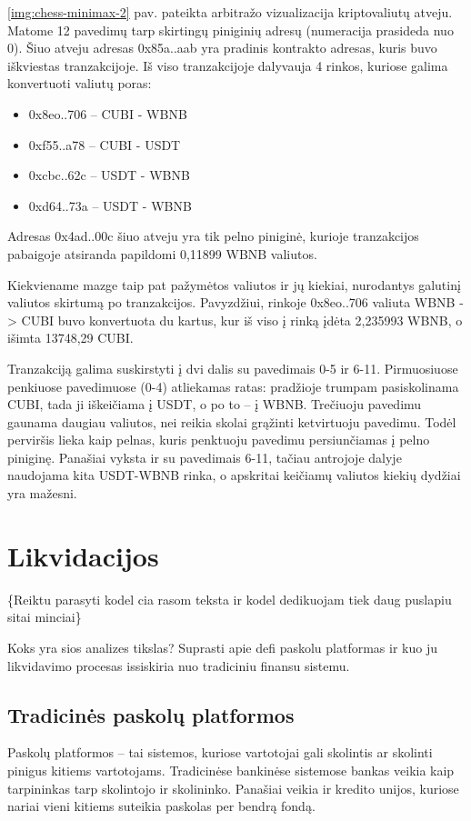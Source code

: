 \documentclass[]{VUMIFTemplateClass}
\begin{document}
\ref{img:chess-minimax-2} pav. pateikta arbitražo vizualizacija kriptovaliutų atveju. Matome 12 pavedimų tarp skirtingų piniginių adresų (numeracija prasideda nuo 0). Šiuo atveju adresas 0x85a..aab yra pradinis kontrakto adresas, kuris buvo iškviestas tranzakcijoje. Iš viso tranzakcijoje dalyvauja 4 rinkos, kuriose galima konvertuoti valiutų poras:

\begin{itemize}
    \item 0x8eo..706 -- CUBI - WBNB
    \item 0xf55..a78 -- CUBI - USDT
    \item 0xcbc..62c -- USDT - WBNB
    \item 0xd64..73a -- USDT - WBNB
\end{itemize}

Adresas 0x4ad..00c šiuo atveju yra tik pelno piniginė, kurioje tranzakcijos pabaigoje atsiranda papildomi 0,11899 WBNB valiutos.

Kiekviename mazge taip pat pažymėtos valiutos ir jų kiekiai, nurodantys galutinį valiutos skirtumą po tranzakcijos. Pavyzdžiui, rinkoje 0x8eo..706 valiuta WBNB -> CUBI buvo konvertuota du kartus, kur iš viso į rinką įdėta 2,235993 WBNB, o išimta 13748,29 CUBI.

Tranzakciją galima suskirstyti į dvi dalis su pavedimais 0-5 ir 6-11. Pirmuosiuose penkiuose pavedimuose (0-4) atliekamas ratas: pradžioje trumpam pasiskolinama CUBI, tada ji iškeičiama į USDT, o po to -- į WBNB. Trečiuoju pavedimu gaunama daugiau valiutos, nei reikia skolai grąžinti ketvirtuoju pavedimu. Todėl perviršis lieka kaip pelnas, kuris penktuoju pavedimu persiunčiamas į pelno piniginę. Panašiai vyksta ir su pavedimais 6-11, tačiau antrojoje dalyje naudojama kita USDT-WBNB rinka, o apskritai keičiamų valiutos kiekių dydžiai yra mažesni.

\section{Likvidacijos}

\{Reiktu parasyti kodel cia rasom teksta ir kodel dedikuojam tiek daug puslapiu sitai minciai\}

Koks yra sios analizes tikslas? Suprasti apie defi paskolu platformas ir kuo ju likvidavimo procesas issiskiria nuo tradiciniu finansu sistemu.

\subsection{Tradicinės paskolų platformos}
Paskolų platformos – tai sistemos, kuriose vartotojai gali skolintis ar skolinti pinigus kitiems vartotojams. Tradicinėse bankinėse sistemose bankas veikia kaip tarpininkas tarp skolintojo ir skolininko. Panašiai veikia ir kredito unijos, kuriose nariai vieni kitiems suteikia paskolas per bendrą fondą.
\end{document}
